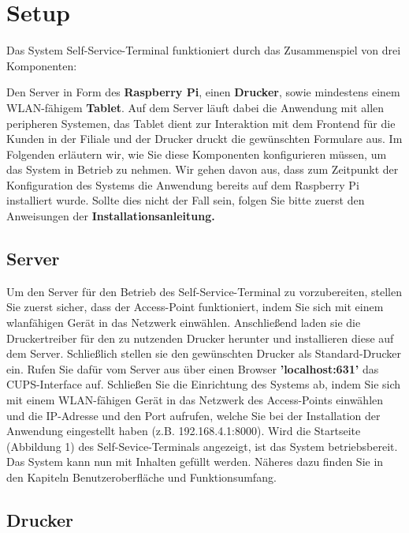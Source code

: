 \section{Setup}
Das System Self-Service-Terminal funktioniert durch das Zusammenspiel von drei Komponenten:\par
\noindent Den Server in Form des \textbf{Raspberry Pi}, einen \textbf{Drucker}, sowie mindestens einem WLAN-fähigem \textbf{Tablet}. Auf dem Server läuft dabei die Anwendung mit allen peripheren Systemen, das Tablet dient zur Interaktion mit dem Frontend für die Kunden in der Filiale und der Drucker druckt die gewünschten Formulare aus. Im Folgenden erläutern wir, wie Sie diese Komponenten konfigurieren müssen, um das System in Betrieb zu nehmen. Wir gehen davon aus, dass zum Zeitpunkt der Konfiguration des Systems die Anwendung bereits auf dem Raspberry Pi installiert wurde. Sollte dies nicht der Fall sein, folgen Sie bitte zuerst den Anweisungen der \textbf{Installationsanleitung.}\\

\subsection{Server}

\noindent Um den Server für den Betrieb des Self-Service-Terminal zu vorzubereiten, stellen Sie zuerst sicher, dass der Access-Point funktioniert, indem Sie sich mit einem wlanfähigen Gerät in das Netzwerk einwählen. Anschließend laden sie die Druckertreiber für den zu nutzenden Drucker herunter und installieren diese auf dem Server. Schließlich stellen sie den gewünschten Drucker als Standard-Drucker ein. Rufen Sie dafür vom Server aus über einen Browser \textbf{'localhost:631'} das CUPS-Interface auf. Schließen Sie die Einrichtung des Systems ab, indem Sie sich mit einem WLAN-fähigen Gerät in das Netzwerk des Access-Points einwählen und die IP-Adresse und den Port aufrufen, welche Sie bei der Installation der Anwendung eingestellt haben (z.B. 192.168.4.1:8000). Wird die Startseite (Abbildung 1) des Self-Sevice-Terminals angezeigt, ist das System betriebsbereit.
Das System kann nun mit Inhalten gefüllt werden. Näheres dazu finden Sie in den Kapiteln \glqq Benutzeroberfläche \grqq{} und \glqq Funktionsumfang\grqq{}.

\newpage

\subsection{Drucker}

